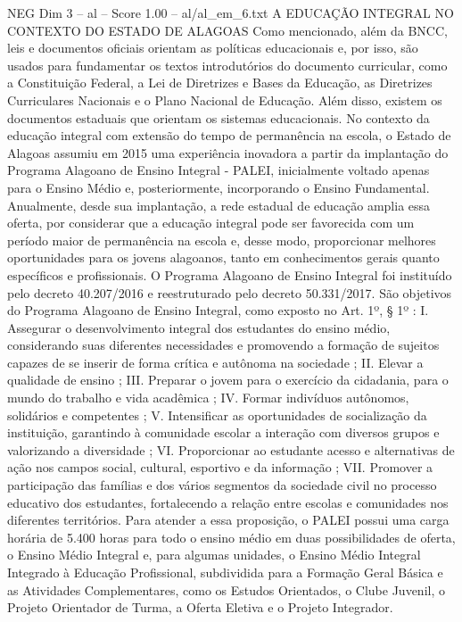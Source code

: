 \begin{textsample}{NEG Dim 3 – al – Score 1.00 – al/al\_em\_6.txt}  \label{ex:f3_neg_078}
A EDUCAÇÃO INTEGRAL NO CONTEXTO DO ESTADO DE ALAGOAS Como mencionado, além da BNCC, leis e documentos oficiais orientam as políticas educacionais e, por isso, são usados para fundamentar os textos introdutórios do documento curricular, como a Constituição Federal, a Lei de Diretrizes e Bases da Educação, as Diretrizes Curriculares Nacionais e o Plano Nacional de Educação.
Além disso, existem os documentos estaduais que orientam os sistemas educacionais.
No contexto da educação integral com extensão do tempo de permanência na escola, o Estado de Alagoas assumiu em 2015 uma experiência inovadora a partir da implantação do Programa Alagoano de Ensino Integral - PALEI, inicialmente voltado apenas para o Ensino Médio e, posteriormente, incorporando o Ensino Fundamental.
Anualmente, desde sua implantação, a rede estadual de educação amplia essa oferta, por considerar que a educação integral pode ser favorecida com um período maior de permanência na escola e, desse modo, proporcionar melhores oportunidades para os jovens alagoanos, tanto em conhecimentos gerais quanto específicos e profissionais.
O Programa Alagoano de Ensino Integral foi instituído pelo decreto 40.207/2016 e reestruturado pelo decreto 50.331/2017.
São objetivos do Programa Alagoano de Ensino Integral, como exposto no Art. 1º, § 1º : I.
Assegurar o desenvolvimento integral dos estudantes do ensino médio, considerando suas diferentes necessidades e promovendo a formação de sujeitos capazes de se inserir de forma crítica e autônoma na sociedade ; II.
Elevar a qualidade de ensino ; III.
Preparar o jovem para o exercício da cidadania, para o mundo do trabalho e vida acadêmica ; IV.
Formar indivíduos autônomos, solidários e competentes ; V.
Intensificar as oportunidades de socialização da instituição, garantindo à comunidade escolar a interação com diversos grupos e valorizando a diversidade ; VI.
Proporcionar ao estudante acesso e alternativas de ação nos campos social, cultural, esportivo e da informação ; VII.
Promover a participação das famílias e dos vários segmentos da sociedade civil no processo educativo dos estudantes, fortalecendo a relação entre escolas e comunidades nos diferentes territórios.
Para atender a essa proposição, o PALEI possui uma carga horária de 5.400 horas para todo o ensino médio em duas possibilidades de oferta, o Ensino Médio Integral e, para algumas unidades, o Ensino Médio Integral Integrado à Educação Profissional, subdividida para a Formação Geral Básica e as Atividades Complementares, como os Estudos Orientados, o Clube Juvenil, o Projeto Orientador de Turma, a Oferta Eletiva e o Projeto Integrador.

\end{textsample}
